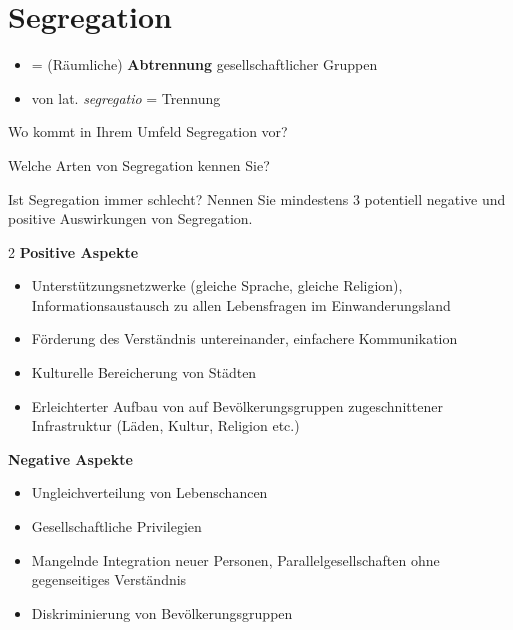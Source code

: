 \section{Segregation}
\begin{itemize}
\item = (Räumliche) \textbf{Abtrennung} gesellschaftlicher Gruppen
\item von lat. \textit{segregatio} = Trennung
\end{itemize}


\begin{myexercise}
Wo kommt in Ihrem Umfeld Segregation vor?

\end{myexercise}

\begin{myexercise}
Welche Arten von Segregation  kennen Sie?

\end{myexercise}

\begin{myexercise}
Ist Segregation immer schlecht? Nennen Sie mindestens 3 potentiell negative und positive Auswirkungen von Segregation.
\begin{myanswer}
\begin{multicols}{2}
\textbf{Positive Aspekte}
\begin{itemize}
\item Unterstützungsnetzwerke (gleiche Sprache, gleiche Religion), Informationsaustausch zu allen Lebensfragen im Einwanderungsland
\item Förderung des Verständnis untereinander, einfachere Kommunikation
\item Kulturelle Bereicherung von Städten
\item Erleichterter Aufbau von auf Bevölkerungsgruppen zugeschnittener Infrastruktur (Läden, Kultur, Religion etc.)
\end{itemize}
\columnbreak
\textbf{Negative Aspekte}
\begin{itemize}
\item Ungleichverteilung von Lebenschancen
\item Gesellschaftliche Privilegien
\item Mangelnde Integration neuer Personen, Parallelgesellschaften ohne gegenseitiges Verständnis
\item Diskriminierung von Bevölkerungsgruppen
\end{itemize}

\end{multicols}
\end{myanswer}
\end{myexercise}

